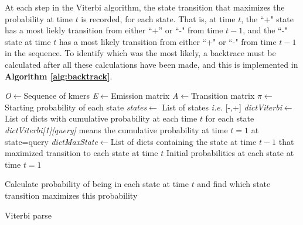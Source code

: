 At each step in the Viterbi algorithm, the state transition that maximizes the probability at time $t$ is recorded, for each state. That is, at time $t$, the ``+" state has a most liekly transition from either ``+'' or ``-" from time $t-1$, and the ``-" state at time $t$ has a most likely transition from either ``+" or ``-" from time $t-1$ in the sequence. To identify which was the most likely, a backtrace must be calculated after all these calculations have been made, and this is implemented in \textbf{Algorithm \ref{alg:backtrack}}.

\begin{algorithm}[H]
\DontPrintSemicolon
{}
\SetAlgoLined
\emph{O}$\leftarrow$Sequence of kmers\;
\emph{E}$\leftarrow$Emission matrix\;
\emph{A}$\leftarrow$Transition matrix\;
\emph{$\pi$}$\leftarrow$Starting probability of each state\;
\emph{states}$\leftarrow$ List of states \emph{i.e.} [-,+]\;
\emph{dictViterbi}$\leftarrow$List of dicts with cumulative probability at each time $t$ for each state\;
\;
\emph{dictViterbi[1][query]} means the cumulative probability at time $t=1$ at state=query\;\;
\emph{dictMaxState}$\leftarrow$List of dicts containing the state at time $t-1$ that maximized transition to each state at time $t$\;
\;
\;
Initial probabilities at each state at time $t=1$\;
\;

Calculate probability of being in each state at time $t$ and find which state transition maximizes this probability\;
 \caption{Viterbi parse}
 \label{alg:viterbi}
\end{algorithm}


